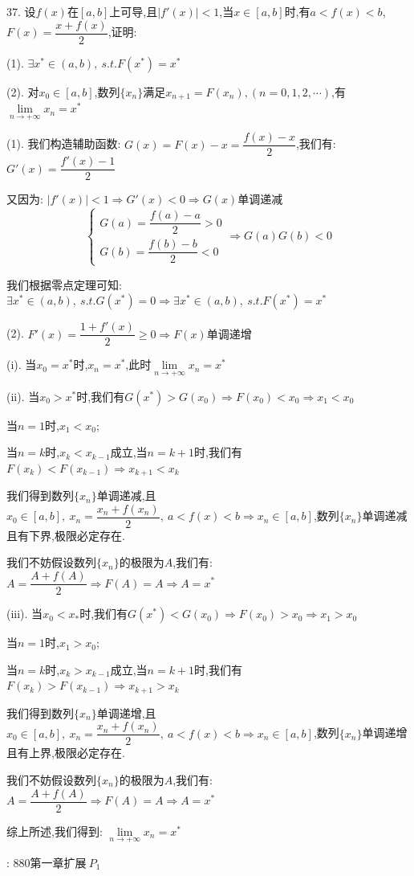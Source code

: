 37. 设$f(x)$在$[a,b]$上可导,且$|f'(x)|<1$,当$x\in[a,b]$时,有$a<f(x)<b$,$F(x)=\dfrac{x+f(x)}{2}$,证明:  

(1). $\exists x^{*}\in(a,b),\ s.t. F(x^{*})=x^{*}$

(2). 对$x_{0}\in[a,b]$,数列$\{x_{n}\}$满足$x_{n+1}=F(x_{n}),(n=0,1,2,\cdots)$,有$\lim\limits_{n\rightarrow+\infty}x_{n}=x^{*}$
\begin{solution}
	
	(1). 我们构造辅助函数:  $G(x)=F(x)-x=\dfrac{f(x)-x}{2}$,我们有:  $G'(x)=\dfrac{f'(x)-1}{2}$
	
	又因为:  $|f'(x)|<1\Rightarrow G'(x)<0\Rightarrow G(x)\text{单调递减}$
	$$\left\lbrace
	\begin{array}{l}
		G(a)=\dfrac{f(a)-a}{2}>0\\
		G(b)=\dfrac{f(b)-b}{2}<0
	\end{array}
	\right. \Rightarrow G(a)G(b)<0$$
	
	我们根据零点定理可知:  $\exists x^{*}\in(a,b),\ s.t. G(x^{*})=0\Rightarrow \exists x^{*}\in(a,b),\ s.t. F(x^{*})=x^{*}$
	
	(2). 
	$F'(x)=\dfrac{1+f'(x)}{2}\geq 0\Rightarrow F(x)\text{单调递增}$
	
	(i). 当$x_{0}=x^{*}$时,$x_{n}=x^{*}$,此时$\lim\limits_{n\rightarrow +\infty}x_{n}=x^{*}$
	
	(ii). 当$x_{0}>x^{*}$时,我们有$G(x^{*})>G(x_{0})\Rightarrow F(x_{0})<x_{0}\Rightarrow x_{1}<x_{0}$
	
	当$n=1$时,$x_{1}<x_{0}$;
	
	当$n=k$时,$x_{k}<x_{k-1}$成立,当$n=k+1$时,我们有$F(x_{k})<F(x_{k-1})\Rightarrow x_{k+1}<x_{k}$
	
	我们得到数列$\{x_{n}\}$单调递减,且$x_{0}\in[a,b],\ x_{n}=\dfrac{x_{n}+f(x_{n})}{2},\ a<f(x)<b\Rightarrow x_{n}\in[a,b]$,数列$\{x_{n}\}$单调递减且有下界,极限必定存在.
	
	我们不妨假设数列$\{x_{n}\}$的极限为$A$,我们有:  $A=\dfrac{A+f(A)}{2}\Rightarrow F(A)=A\Rightarrow A=x^{*}$
	
	(iii). 当$x_{0}<x_{*}$时,我们有$G(x^{*})<G(x_{0})\Rightarrow F(x_{0})>x_{0}\Rightarrow x_{1}>x_{0}$
	
	当$n=1$时,$x_{1}>x_{0}$;
	
	当$n=k$时,$x_{k}>x_{k-1}$成立,当$n=k+1$时,我们有$F(x_{k})>F(x_{k-1})\Rightarrow x_{k+1}>x_{k}$
	
	我们得到数列$\{x_{n}\}$单调递增,且$x_{0}\in[a,b],\ x_{n}=\dfrac{x_{n}+f(x_{n})}{2},\ a<f(x)<b\Rightarrow x_{n}\in[a,b]$,数列$\{x_{n}\}$单调递增且有上界,极限必定存在.
	
	我们不妨假设数列$\{x_{n}\}$的极限为$A$,我们有:  $A=\dfrac{A+f(A)}{2}\Rightarrow F(A)=A\Rightarrow A=x^{*}$
	
	综上所述,我们得到:  $\lim\limits_{n\rightarrow+\infty}x_{n}=x^{*}$
\end{solution}
\begin{anymark}[注]
	[题目来源]:  $880\text{第一章扩展} \ P_{1}$
\end{anymark}

